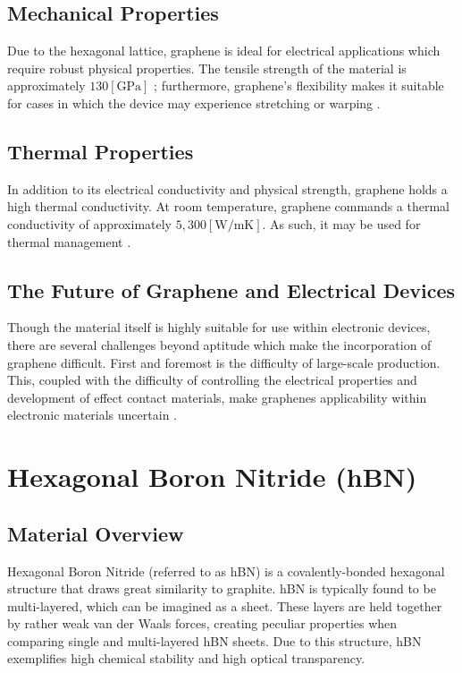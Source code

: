 \documentclass[conference]{IEEEtran}
\begin{document}
\subsection{Mechanical Properties}

Due to the hexagonal lattice, graphene is ideal for electrical applications which require robust physical properties. The tensile strength of the material is approximately $130[\si{\giga\pascal}]$ \cite{b5}; furthermore, graphene's flexibility makes it suitable for cases in which the device may experience stretching or warping \cite{b6}.

\subsection{Thermal Properties}

In addition to its electrical conductivity and physical strength, graphene holds a high thermal conductivity. At room temperature, graphene commands a thermal conductivity of approximately $5,300[\si{\watt\per\milli\kelvin}]$. As such, it may be used for thermal management \cite{b7}.

\subsection{The Future of Graphene and Electrical Devices}

Though the material itself is highly suitable for use within electronic devices, there are several challenges beyond aptitude which make the incorporation of graphene difficult. First and foremost is the difficulty of large-scale production. This, coupled with the difficulty of controlling the electrical properties and development of effect contact materials, make graphenes applicability within electronic materials uncertain \cite{b8}.

\section{Hexagonal Boron Nitride (hBN)}

\subsection{Material Overview}

Hexagonal Boron Nitride (referred to as hBN) is a covalently-bonded hexagonal structure that draws great similarity to graphite. hBN is typically found to be multi-layered, which can be imagined as a sheet. These layers are held together by rather weak van der Waals forces, creating peculiar properties when comparing single and multi-layered hBN sheets. Due to this structure, hBN exemplifies high chemical stability and high optical transparency.
\end{document}
